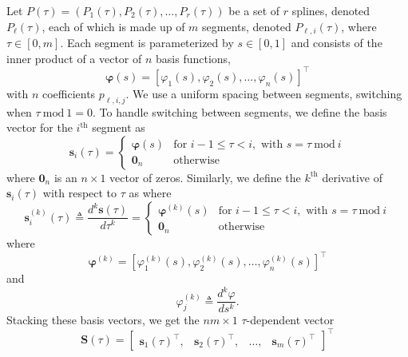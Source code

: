 Let $P(\tau) = (P_1(\tau), P_2(\tau), \dots, P_r(\tau))$ be a set of $r$ splines, denoted $P_\ell(\tau)$, each of which is made up of $m$ segments, denoted $P_{\ell, i}(\tau)$,
where $\tau \in [0, m]$.
Each segment is parameterized by $s \in [0,1]$ and consists of the inner product of a vector of $n$ basis functions,
\begin{equation}
	\boldsymbol{\varphi}(s) = [\varphi_1(s), \varphi_2(s), \dots, \varphi_n(s)]^\top
\end{equation}
with $n$ coefficients $p_{\ell, i, j}$.
We use a uniform spacing between segments, switching when $\tau\: \mathrm{mod}\: 1 = 0$.
To handle switching between segments, we define the basis vector for the $i^\text{th}$ segment as
\begin{equation}
	\mathbf{s}_i(\tau) = 
	\begin{cases} 
		\boldsymbol{\varphi}(s) & \text{for } i - 1 \leq \tau < i, \text{ with } s = \tau\: \mathrm{mod}\: i \\
		\mathbf{0}_n & \text{otherwise}
	\end{cases}
\end{equation}
where $\mathbf{0}_n$ is an $n \times 1$ vector of zeros.
Similarly, we define the $k^\text{th}$ derivative of 
$\mathbf{s}_i(\tau)$ with respect to $\tau$ as
 where
\begin{equation}
\mathbf{s}^{(k)}_i(\tau) \triangleq \frac{d^k \mathbf{s}(\tau)}{d\tau^k} = 
	\begin{cases} 
		\boldsymbol{\varphi}^{(k)} (s) & \text{for } i - 1 \leq \tau < i, \text{ with } s = \tau\: \mathrm{mod}\: i \\
		\mathbf{0}_n & \text{otherwise}
	\end{cases}
\end{equation}
where 
\begin{equation}
	\boldsymbol{\varphi}^{(k)} = [\varphi^{(k)}_1(s), \varphi^{(k)}_2(s), \dots, \varphi^{(k)}_n(s)]^\top
\end{equation}
and 
\begin{equation}
	\varphi_j^{(k)} \triangleq \frac{d^k\varphi}{ds^k}.
\end{equation}
Stacking these basis vectors, we get the $nm\times 1$ $\tau$-dependent vector
\begin{equation}
	\mathbf{S}(\tau) = 
	\begin{bmatrix} 
		\mathbf{s}_1(\tau)^\top, &
		\mathbf{s}_2(\tau)^\top, &
		\dots, &
		\mathbf{s}_m(\tau)^\top
	\end{bmatrix}^\top
\end{equation}

